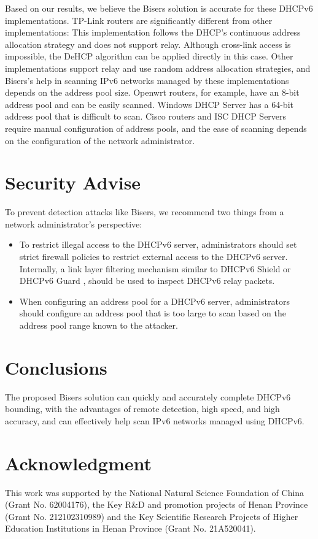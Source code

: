 \documentclass[conference]{IEEEtran}
\begin{document}
Based on our results, we believe the Bisers solution is accurate for
these DHCPv6 implementations. TP-Link routers are significantly
different from other implementations: This implementation follows the
DHCP's continuous address allocation strategy and does not support
relay. Although cross-link access is impossible, the DeHCP algorithm
can be applied directly in this case. Other implementations support
relay and use random address allocation strategies, and Bisers's help
in scanning IPv6 networks managed by these implementations depends on
the address pool size. Openwrt routers, for example, have an 8-bit
address pool and can be easily scanned. Windows DHCP Server has a
64-bit address pool that is difficult to scan. Cisco routers and ISC
DHCP Servers require manual configuration of address pools, and the
ease of scanning depends on the configuration of the network
administrator.

\section{Security Advise}

To prevent detection attacks like Bisers, we recommend two things from
a network administrator's perspective:

\begin{itemize}
\item To restrict illegal access to the DHCPv6 server, administrators
  should set strict firewall policies to restrict external access to
  the DHCPv6 server. Internally, a link layer filtering mechanism
  similar to DHCPv6 Shield \cite{gont_dhcpv6-shield_2015} or DHCPv6
  Guard \cite{noauthor_guard_nodate}, should be used to inspect DHCPv6
  relay packets.
\item When configuring an address pool for a DHCPv6 server,
  administrators should configure an address pool that is too large to
  scan based on the address pool range known to the attacker.
\end{itemize}

\section{Conclusions}

The proposed Bisers solution can quickly and accurately complete
DHCPv6 bounding, with the advantages of remote detection, high speed,
and high accuracy, and can effectively help scan IPv6 networks managed
using DHCPv6.

\section*{Acknowledgment}

This work was supported by the National Natural Science Foundation of
China (Grant No. 62004176), the Key R\&D and promotion projects of
Henan Province (Grant No. 212102310989) and the Key Scientific
Research Projects of Higher Education Institutions in Henan Province
(Grant No. 21A520041).



\end{document}
